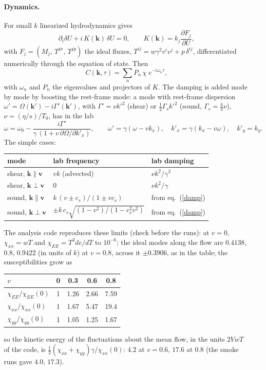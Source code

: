 \documentclass[11pt,aps,preprint,nofootinbib,superscriptaddress,tightenlines]{revtex4-2}
\def\st{\begin{equation}}
\def\stp{\end{equation}}
\def\Eq#1{eq.~(\ref{#1})}
\let\oldparagraph\paragraph
\renewcommand{\paragraph}{\par\bigskip\oldparagraph}
\begin{document}
\paragraph{Dynamics.}  For small $k$ linearized hydrodynamics gives
\st
\partial_t\delta U+i\,K(\bm k)\,\delta U=0,\qquad K(\bm k)=k_j\frac{\partial F_j}{\partial U},
\stp
with $F_j=(M_j,\,T^{jx},\,T^{jy})$ the ideal fluxes, $T^{ij}=w\gamma^2v^iv^j+p\,\delta^{ij}$,
differentiated numerically through the equation of state.  Then
\st
C(\bm k,\tau)=\sum_nP_n\,\chi\;e^{-i\omega_n\tau},
\stp
with $\omega_n$ and $P_n$ the eigenvalues and projectors of $K$.  The damping is added mode by
mode by boosting the rest-frame mode: a mode with rest-frame dispersion
$\omega'=\Omega(\bm k')-i\Gamma'(\bm k')$, with $\Gamma'=\nu k'^2$ (shear) or $\tfrac12\Gamma_sk'^2$ (sound,
$\Gamma_s=\tfrac43\nu$), $\nu=(\eta/s)/T_0$, has in the lab
\st
\omega=\omega_0-\frac{i\Gamma'}{\gamma\,(1+v\,\partial\Omega/\partial k'_x)},
\qquad \omega'=\gamma(\omega-vk_x),\quad k'_x=\gamma(k_x-v\omega),\quad k'_y=k_y .
\label{damp}
\stp
The simple cases:
\begin{center}
\begin{tabular}{lll}
\hline
mode & lab frequency & lab damping \\ \hline
shear, $\bm k\parallel\bm v$ & $vk$ (advected) & $\nu k^2/\gamma^3$ \\
shear, $\bm k\perp\bm v$ & $0$ & $\nu k^2/\gamma$ \\
sound, $\bm k\parallel\bm v$ & $k\,(v\pm c_s)/(1\pm vc_s)$ & from \Eq{damp} \\
sound, $\bm k\perp\bm v$ & $\pm k\,c_s\sqrt{(1-v^2)/(1-c_s^2v^2)}$ & from \Eq{damp} \\
\hline
\end{tabular}
\end{center}
The analysis code reproduces these limits (check before the runs): at $v=0$, $\chi_{xx}=wT$ and
$\chi_{EE}=T^2de/dT$ to $10^{-6}$; the ideal modes along the flow are $0.4138$, $0.8$, $0.9422$ (in units of
$k$) at $v=0.8$, across it $\pm0.3906$, as in the table; the susceptibilities grow as
\begin{center}
\begin{tabular}{lcccc}
\hline
$v$ & 0 & 0.3 & 0.6 & 0.8 \\ \hline
$\chi_{EE}/\chi_{EE}(0)$ & 1 & 1.26 & 2.66 & 7.59 \\
$\chi_{xx}/\chi_{xx}(0)$ & 1 & 1.67 & 5.47 & 19.4 \\
$\chi_{yy}/\chi_{yy}(0)$ & 1 & 1.05 & 1.25 & 1.67 \\
\hline
\end{tabular}
\end{center}
so the kinetic energy of the fluctuations about the mean flow, in the units $2VwT$ of the code, is
$\tfrac12(\chi_{xx}+\chi_{yy})\gamma/\chi_{xx}(0)$: $4.2$ at $v=0.6$, $17.6$ at $0.8$ (the smoke runs gave $4.0$, $17.3$).
\end{document}
